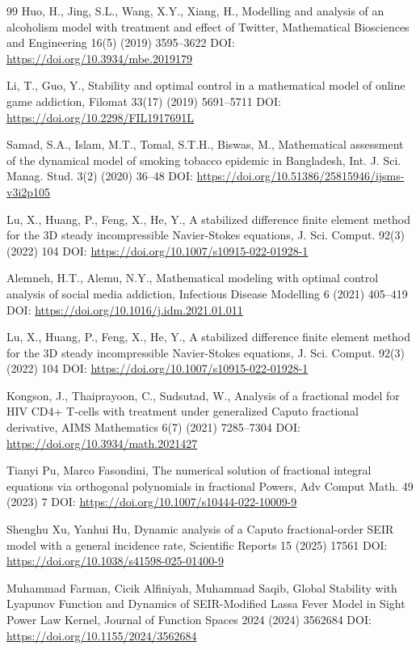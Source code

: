 \documentclass[10pt]{NSP1}
\begin{document}
\begin{thebibliography}{99}
Huo, H., Jing, S.L., Wang, X.Y., Xiang, H., Modelling and analysis of an alcoholism model with treatment and effect of Twitter, Mathematical Biosciences and Engineering 16(5) (2019) 3595–3622 DOI: \url{https://doi.org/10.3934/mbe.2019179}

Li, T., Guo, Y., Stability and optimal control in a mathematical model of online game addiction, Filomat 33(17) (2019) 5691–5711 DOI: \url{https://doi.org/10.2298/FIL1917691L}

Samad, S.A., Islam, M.T., Tomal, S.T.H., Biswas, M., Mathematical assessment of the dynamical model of smoking tobacco epidemic in Bangladesh, Int. J. Sci. Manag. Stud. 3(2) (2020) 36–48 DOI: \url{https://doi.org/10.51386/25815946/ijsms-v3i2p105}

Lu, X., Huang, P., Feng, X., He, Y., A stabilized difference finite element method for the 3D steady incompressible Navier-Stokes equations, J. Sci. Comput. 92(3) (2022) 104 DOI: \url{https://doi.org/10.1007/s10915-022-01928-1}

Alemneh, H.T., Alemu, N.Y., Mathematical modeling with optimal control analysis of social media addiction, Infectious Disease Modelling 6 (2021) 405–419 DOI: \url{https://doi.org/10.1016/j.idm.2021.01.011}

Lu, X., Huang, P., Feng, X., He, Y., A stabilized difference finite element method for the 3D steady incompressible Navier-Stokes equations, J. Sci. Comput. 92(3) (2022) 104 DOI: \url{https://doi.org/10.1007/s10915-022-01928-1}

Kongson, J., Thaiprayoon, C., Sudsutad, W., Analysis of a fractional model for HIV CD4+ T-cells with treatment under generalized Caputo fractional derivative, AIMS Mathematics 6(7) (2021) 7285–7304 DOI: \url{https://doi.org/10.3934/math.2021427}

Tianyi Pu, Marco Fasondini, The numerical solution of fractional integral equations via orthogonal polynomials in fractional Powers, Adv Comput Math. 49 (2023) 7 DOI: \url{https://doi.org/10.1007/s10444-022-10009-9}

Shenghu Xu, Yanhui Hu, Dynamic analysis of a Caputo fractional-order SEIR model with a general incidence rate, Scientific Reports 15 (2025) 17561 DOI: \url{https://doi.org/10.1038/s41598-025-01400-9}

Muhammad Farman, Cicik Alfiniyah, Muhammad Saqib, Global Stability with Lyapunov Function and Dynamics of SEIR-Modified Lassa Fever Model in Sight Power Law Kernel, Journal of Function Spaces 2024 (2024) 3562684 DOI: \url{https://doi.org/10.1155/2024/3562684}


\end{thebibliography}
\end{document}
